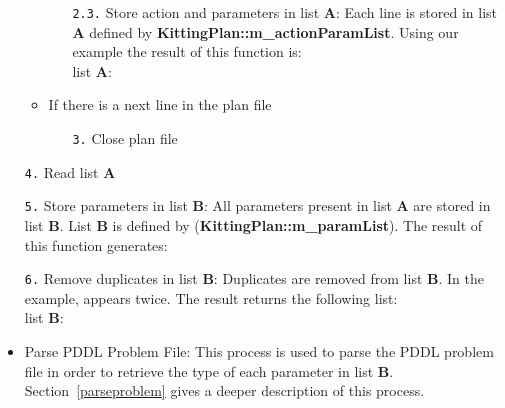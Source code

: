 \begin{itemize}
\begin{itemize}
\begin{itemize}
\item[\texttt{2.3.}] Store action and parameters in list \textbf{A}: Each line is stored in list \textbf{A} defined by \textbf{\footnotesize{KittingPlan::m\_actionParamList}}. Using our example the result of this function is:\\
    list \textbf{A}: \small{}
\end{itemize}
\item If there is a next line in the plan file
\begin{itemize}
\item[\texttt{3.}] Close plan file
\end{itemize}
\end{itemize}
\item[\texttt{4.}] Read list \textbf{A}
\item[\texttt{5.}] Store parameters in list \textbf{B}: All parameters present in list \textbf{A} are stored in list \textbf{B}. List \textbf{B} is defined by (\textbf{\small{KittingPlan::m\_paramList}}). The result of this function generates:\\ \small{}
\item[\texttt{6.}] Remove duplicates in list \textbf{B}: Duplicates are removed from list \textbf{B}. In the example,  appears twice. The result returns the following list:\\
    list \textbf{B}: \small{}
\item Parse PDDL Problem File: This process is used to parse the PDDL problem file in order to retrieve the type of each parameter in list \textbf{B}. Section~\ref{parseproblem} gives a deeper description of this process.
\end{itemize}

\newpage
